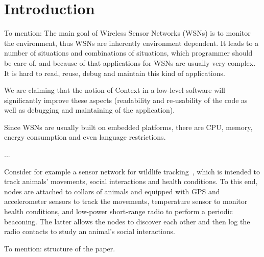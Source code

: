 \section{Introduction} To mention: The main goal of Wireless Sensor Networks
(WSNs) is to monitor the environment, thus WSNs are inherently environment
dependent. It leads to a number of situations and combinations of situations,
which programmer should be care of, and because of that applications for WSNs
are usually very complex. It is hard to read, reuse, debug and maintain this
kind of applications.

We are claiming that the notion of Context in a low-level software will
significantly improve these aspects (readability and re-usability of the code
as well as debugging and maintaining of the application).

Since WSNs are usually built on embedded platforms, there are CPU, memory,
energy consumption and even language restrictions.

...

Consider for example a sensor network for wildlife tracking~\cite{pasztor10},
which is intended to track animals' movements, social interactions and health
conditions. To this end, nodes are attached to collars of animals and equipped
with GPS and accelerometer sensors to track the movements, temperature sensor
to monitor health conditions, and low-power short-range radio to perform a
periodic beaconing. The latter allows the nodes to discover each other and then
log the radio contacts to study an animal's social interactions.

To mention: structure of the paper.